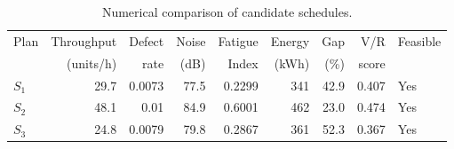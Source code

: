 \begin{table}[htbp]
\centering
\caption{Numerical comparison of candidate schedules.}
\label{tab:numerical-sim}
\small
\begin{tabular}{@{}lrrrrrrrl@{}}
\toprule
Plan & Throughput & Defect & Noise & Fatigue & Energy & Gap & V/R & Feasible \\
     & (units/h)  & rate   & (dB)  & Index   & (kWh)  & (\%) & score &         \\
\midrule
$S_{1}$ & 29.7 & 0.0073 & 77.5 & 0.2299 & 341 & 42.9 & 0.407 & Yes \\
$S_{2}$ & 48.1 & 0.01 & 84.9 & 0.6001 & 462 & 23.0 & 0.474 & Yes \\
$S_{3}$ & 24.8 & 0.0079 & 79.8 & 0.2867 & 361 & 52.3 & 0.367 & Yes \\
\bottomrule
\end{tabular}
\end{table}
